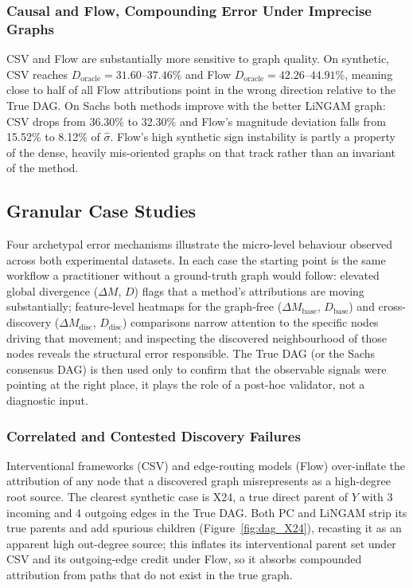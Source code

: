 \documentclass[12pt,a4paper,oneside]{article}
\begin{document}
\subsubsection{Causal and Flow, Compounding Error Under Imprecise Graphs}

CSV and Flow are substantially more sensitive to graph quality. On synthetic, CSV reaches $D_{\text{oracle}} = 31.60$--$37.46\%$ and Flow $D_{\text{oracle}} = 42.26$--$44.91\%$, meaning close to half of all Flow attributions point in the wrong direction relative to the True DAG. On Sachs both methods improve with the better LiNGAM graph: CSV drops from 36.30\% to 32.30\% and Flow's magnitude deviation falls from 15.52\% to 8.12\% of $\hat{\sigma}$. Flow's high synthetic sign instability is partly a property of the dense, heavily mis-oriented graphs on that track rather than an invariant of the method.

\subsection{Granular Case Studies}
\label{sec:cases}

Four archetypal error mechanisms illustrate the micro-level behaviour observed across both experimental datasets. In each case the starting point is the same workflow a practitioner without a ground-truth graph would follow: elevated global divergence ($\Delta M$, $D$) flags that a method's attributions are moving substantially; feature-level heatmaps for the graph-free ($\Delta M_{\text{base}}$, $D_{\text{base}}$) and cross-discovery ($\Delta M_{\text{disc}}$, $D_{\text{disc}}$) comparisons narrow attention to the specific nodes driving that movement; and inspecting the discovered neighbourhood of those nodes reveals the structural error responsible. The True DAG (or the Sachs consensus DAG) is then used only to confirm that the observable signals were pointing at the right place, it plays the role of a post-hoc validator, not a diagnostic input.

\subsubsection{Correlated and Contested Discovery Failures}

Interventional frameworks (CSV) and edge-routing models (Flow) over-inflate the attribution of any node that a discovered graph misrepresents as a high-degree root source. The clearest synthetic case is X24, a true direct parent of $Y$ with 3 incoming and 4 outgoing edges in the True DAG. Both PC and LiNGAM strip its true parents and add spurious children (Figure~\ref{fig:dag_X24}), recasting it as an apparent high out-degree source; this inflates its interventional parent set under CSV and its outgoing-edge credit under Flow, so it absorbs compounded attribution from paths that do not exist in the true graph.
\end{document}
